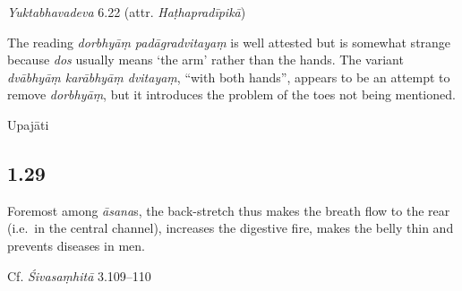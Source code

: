 \begin{ekdosis}
\begin{testimonia}[hp01_028]
\begin{versinnote}
\tl{\var{dorbhyāṃ padāgradvitayaṃ ] dvābhyāṃ karābhyāṃ dvitayaṃ n1,n3}\\!}
\end{versinnote}

\emph{Yuktabhavadeva} 6.22 (attr. \emph{Haṭhapradīpikā})

\begin{versinnote}
\end{versinnote}

\end{testimonia}

\begin{philcomm}[hp01_028]
The reading \emph{dorbhyāṃ padāgradvitayaṃ} is well attested but is somewhat strange because \emph{dos} usually means `the arm' rather than the hands. The variant \emph{dvābhyāṃ karābhyāṃ dvitayaṃ}, “with both hands”,  appears to be an attempt to remove \emph{dorbhyāṃ}, but it introduces the problem of the toes not being mentioned.
\end{philcomm}

\begin{metre}[hp01_028]
Upajāti
\end{metre}

\subsection*{1.29}
\begin{translation}[hp01_029]
Foremost among \emph{āsana}s, the back-stretch thus makes the breath flow to the rear (i.e.~in the central channel), increases the digestive fire, makes the belly thin and prevents diseases in men.
\end{translation}

\begin{sources}[hp01_029]
Cf. \emph{Śivasaṃhitā} 3.109–110


\end{sources}
\end{ekdosis}
